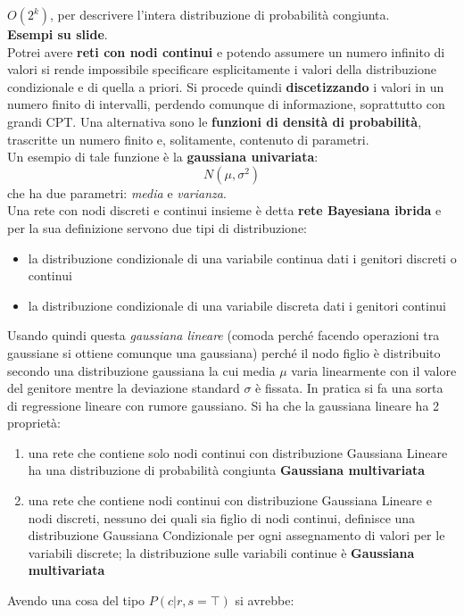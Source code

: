 \message{ !name(modprob.tex)}\documentclass[a4paper,12pt, oneside]{book}
\begin{document}
$O(2^k)$, per descrivere l'intera distribuzione di probabilità congiunta.\\
\textbf{Esempi su slide}.\\
Potrei avere \textbf{reti con nodi continui} e potendo assumere un numero
infinito di valori si rende impossibile specificare esplicitamente i valori della
distribuzione condizionale e di quella a priori. Si procede quindi
\textbf{discetizzando} i valori in un numero finito di intervalli, perdendo
comunque di informazione, soprattutto con grandi CPT. Una alternativa sono le
\textbf{funzioni di densità di probabilità}, trascritte un numero finito e,
solitamente, contenuto di parametri.\\
Un esempio di tale funzione è la \textbf{gaussiana univariata}:
\[N(\mu,\sigma^2)\]
che ha due parametri: \textit{media} e \textit{varianza}.\\
Una rete con nodi discreti e continui insieme è detta \textbf{rete Bayesiana
  ibrida} e per la sua definizione servono due tipi di distribuzione:
\begin{itemize}
  \item la distribuzione condizionale di una variabile continua dati i genitori
  discreti o continui
  \item la distribuzione condizionale di una variabile discreta dati i genitori
  continui 
\end{itemize}
Usando quindi questa \textit{gaussiana lineare} (comoda perché facendo
operazioni tra gaussiane si ottiene comunque una gaussiana) perché il nodo
figlio è 
distribuito secondo una distribuzione gaussiana la cui media $\mu$ varia
linearmente con il valore del genitore mentre la deviazione standard $\sigma$ è
fissata. In pratica si fa una sorta di regressione lineare con rumore
gaussiano. Si ha che la gaussiana lineare ha 2 proprietà:
\begin{enumerate}
  \item una rete che contiene solo nodi continui con distribuzione Gaussiana
  Lineare ha una 
  distribuzione di probabilità congiunta \textbf{Gaussiana multivariata}
  \item una rete che contiene nodi continui con distribuzione Gaussiana Lineare
  e nodi discreti, 
  nessuno dei quali sia figlio di nodi continui, definisce una distribuzione
  Gaussiana Condizionale 
  per ogni assegnamento di valori per le variabili discrete; la distribuzione
  sulle variabili continue 
  è \textbf{Gaussiana multivariata}
\end{enumerate}
Avendo una cosa del tipo $P(c|r,s=\top)$ si avrebbe:
\end{document}

